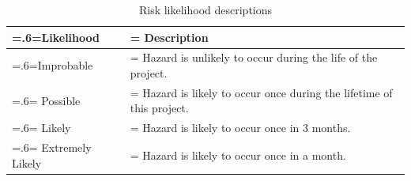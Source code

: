 \documentclass[twocolumn]{article}
\begin{document}
\begin{table}
    \begin{center}
        \begin{tabularx}{\linewidth} { 
            | >{\hsize=.6\hsize\linewidth=\hsize}X 
            | >{\hsize=1.4\hsize\linewidth=\hsize}X  | }
            \hline
            \textbf{Likelihood} & \textbf{Description} \\
            \hline
            Improbable & Hazard is unlikely to occur during the life of the project. \\
            \hline
            Possible & Hazard is likely to occur once during the lifetime of this project. \\
            \hline
            Likely & Hazard is likely to occur once in 3 months. \\
            \hline
            Extremely Likely & Hazard is likely to occur once in a month. \\
            \hline
        \end{tabularx}
    \end{center}
    \caption{Risk likelihood descriptions}
    \label{table:likelihood}
\end{table}
\end{document}

